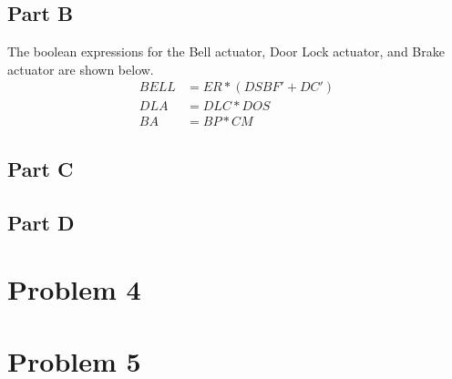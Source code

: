 \documentclass{article}
\begin{document}
\subsection{Part B}
The boolean expressions for the Bell actuator, Door Lock actuator, and Brake actuator are shown below.
\begin{align*}
    BELL &= ER * (DSBF' + DC') \\
    DLA &= DLC * DOS \\
    BA &= BP * CM
\end{align*}

\subsection{Part C}


\subsection{Part D}

\section{Problem 4}

\section{Problem 5}
\end{document}
